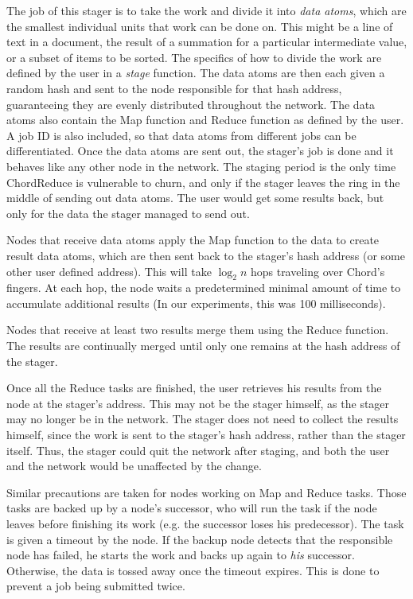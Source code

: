 \documentclass[10pt, conference, compsocconf]{IEEEtran}
\begin{document}
The job of this stager is to take the work and divide it into \emph{data atoms}, which are the smallest individual units that work can be done on.  This might be a line of text in a document, the result of a summation for a particular intermediate value, or a subset of items to be sorted.  The specifics of how to divide the work are defined by the user in a \emph{stage} function.  The data atoms are then each given a random hash and sent to the node responsible for that hash address, guaranteeing they are evenly distributed throughout the network.  The data atoms also contain the Map function and Reduce function as defined by the user.  A job ID is also included, so that data atoms from different jobs can be differentiated.  Once the data atoms are sent out, the stager's job is done and it behaves like any other node in the network. The staging period is the only time ChordReduce is vulnerable to churn, and only if the stager leaves the ring in the middle of sending out data atoms.  The user would get some results back, but only for the data the stager managed to send out.

Nodes that receive data atoms apply the Map function to the data to create result data atoms, which are then sent back to the stager's hash address (or some other user defined address).  This will take $\log_{2} n$ hops traveling over Chord's fingers.  At each hop, the node waits a predetermined minimal amount of time to accumulate additional results (In our experiments, this was 100 milliseconds).

Nodes that receive at least two results merge them using the Reduce function.  The results are continually merged until only one remains at the hash address of the stager. 



Once all the Reduce tasks are finished, the user retrieves his results from the node at the stager's address.  This may not be the stager himself, as the stager may no longer be in the network.  The stager does not need to collect the results himself, since the work is sent to the stager's hash address, rather than the stager itself.  Thus, the stager could quit the network after staging, and both the user and the network would be unaffected by the change. %

Similar precautions are taken for nodes working on Map and Reduce tasks.  Those tasks are backed up by a node's successor, who will run the task if the node leaves before finishing its work (e.g. the successor loses his predecessor).   The task is given a timeout by the node.  If the backup node detects that the responsible node has failed, he starts the work and backs up again to \emph{his} successor.  Otherwise, the data is tossed away once the timeout expires. This is done to prevent a job being submitted twice.
\end{document}
